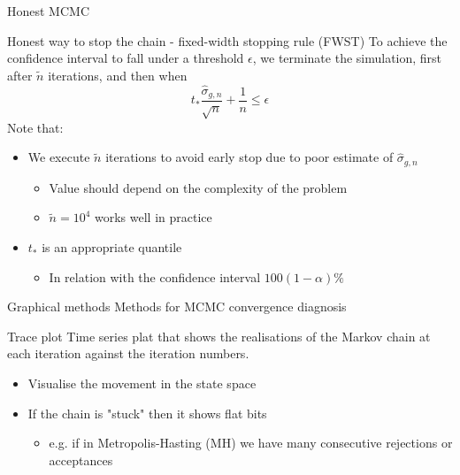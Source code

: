 \documentclass{beamer}
\begin{document}
\begin{frame}{Honest MCMC}
  \begin{block}{Honest way to stop the chain - fixed-width stopping rule (FWST)}
    To achieve the confidence interval to fall under a threshold $\epsilon$, we terminate the simulation, first after $\tilde{n}$ iterations, and then when
    \[
      t_*\frac{\widehat{\sigma}_{g,n}}{\sqrt{n}}+\frac{1}{n} \leq \epsilon
    \]
    Note that:
    \begin{itemize}
      \item We execute $\tilde{n}$ iterations to avoid early stop due to poor estimate of $\widehat{\sigma}_{g,n}$
        \begin{itemize}
          \item Value should depend on the complexity of the problem
          \item $\tilde{n} = 10^4$ works well in practice
        \end{itemize}
      \item $t_*$ is an appropriate quantile
        \begin{itemize}
          \item In relation with the confidence interval $100(1-\alpha)\%$
        \end{itemize}
    \end{itemize}
  \end{block}
\end{frame}

\begin{frame}{Graphical methods}
  Methods for MCMC convergence diagnosis
  \begin{block}{Trace plot}
    Time series plat that shows the realisations of the Markov chain at each iteration against the iteration numbers.
    \begin{itemize}
      \item Visualise the movement in the state space
      \item If the chain is "stuck" then it shows flat bits
        \begin{itemize}
          \item e.g. if in Metropolis-Hasting (MH) we have many consecutive rejections or acceptances
        \end{itemize}
    \end{itemize}
  \end{block}
\end{frame}
\end{document}
